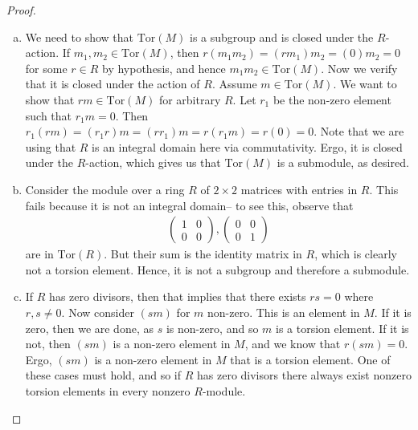 \documentclass[num=2,duedate=02-10-21,course=Algebra\ II,proflastname=Walton]{hwtemplate}
\begin{document}
\begin{proof}
	\begin{enumerate}[(a).]
		\item We need to show that \( \textrm{Tor}(M)\) is a subgroup and is closed under the \(R\)-action. If \(m_1,m_2 \in \textrm{Tor}(M)\), then \(r(m_1m_2) = (rm_1)m_2 = (0)m_2 = 0\) for some \(r \in R\) by hypothesis, and hence \(m_1m_2 \in \textrm{Tor}(M)\). Now we verify that it is closed under the action of \(R\). Assume \(m \in \textrm{Tor}(M)\). We want to show that \(rm \in \textrm{Tor}(M)\) for arbitrary \(R\). Let \(r_1\) be the non-zero element such that \(r_1m = 0\). Then \(r_1(rm) = (r_1 r)m = (r r_1)m = r(r_1m) = r(0) = 0\). Note that we are using that \(R\) is an integral domain here via commutativity. Ergo, it is closed under the \(R\)-action, which gives us that \( \textrm{Tor}(M)\) is a submodule, as desired.
		\item Consider the module over a ring \(R\) of \(2\times 2\) matrices with entries in \(R\). This fails because it is not an integral domain-- to see this, observe that
			\begin{align*}
				\begin{pmatrix} 1 & 0 \\ 0 & 0 \end{pmatrix} , \begin{pmatrix} 0 & 0 \\ 0 & 1 \end{pmatrix} 
			\end{align*}
			are in \( \textrm{Tor}(R)\). But their sum is the identity matrix in \(R\), which is clearly not a torsion element. Hence, it is not a subgroup and therefore a submodule.
		\item If \(R\) has zero divisors, then that implies that there exists \(rs = 0\) where \(r,s \neq 0\). Now consider \((sm)\) for \(m\) non-zero. This is an element in \(M\). If it is zero, then we are done, as \(s\) is non-zero, and so \(m\) is a torsion element. If it is not, then \((sm)\) is a non-zero element in \(M\), and we know that \(r(sm) = 0\). Ergo, \((sm)\) is a non-zero element in \(M\) that is a torsion element. One of these cases must hold, and so if \(R\) has zero divisors there always exist nonzero torsion elements in every nonzero \(R\)-module.
	\end{enumerate}
\end{proof}
\end{document}
